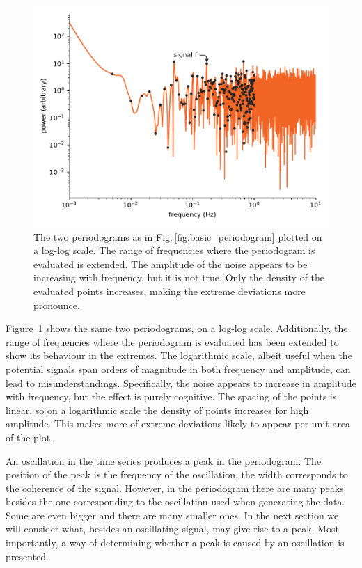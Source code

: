 \begin{figure}
  \centering
  \includegraphics[width=\linewidth]{gfx/axions/basic_periodogram_loglog.pdf}
  \caption{The two periodograms as in Fig.\,\ref{fig:basic_periodogram} plotted on a log-log scale.
  The range of frequencies where the periodogram is evaluated is extended.
  The amplitude of the noise appears to be increasing with frequency, but it is not true.
  Only the density of the evaluated points increases, making the extreme deviations more pronounce.}\label{fig:basic_periodogram_loglog}
\end{figure}

Figure~\ref{fig:basic_periodogram_loglog} shows the same two periodograms, on a log-log scale.
Additionally, the range of frequencies where the periodogram is evaluated has been extended to show its behaviour in the extremes.
The logarithmic scale, albeit useful when the potential signals span orders of magnitude in both frequency and amplitude, can lead to misunderstandings.
Specifically, the noise appears to increase in amplitude with frequency, but the effect is purely cognitive.
The spacing of the points is linear, so on a logarithmic scale the density of points increases for high amplitude.
This makes more of extreme deviations likely to appear per unit area of the plot.%

An oscillation in the time series produces a peak in the periodogram.
The position of the peak is the frequency of the oscillation, the width corresponds to the coherence of the signal.
However, in the periodogram there are many peaks besides the one corresponding to the oscillation used when generating the data.
Some are even bigger and there are many smaller ones.
In the next section we will consider what, besides an oscillating signal, may give rise to a peak.
Most importantly, a way of determining whether a peak is caused by an oscillation is presented.




